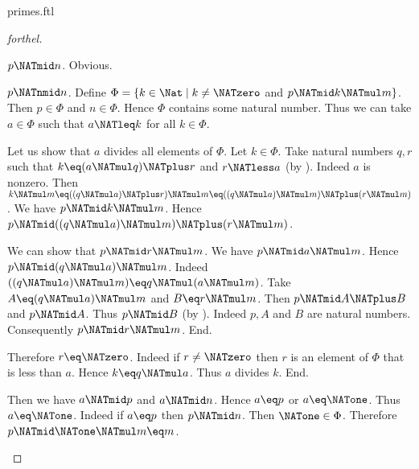 \documentclass{naproche-library}
\begin{document}
\begin{smodule}[title=Prime Numbers]{primes.ftl}
\begin{proof}[forthel]
  \begin{case}{$p \NATmid n$.}
    Obvious.
  \end{case}

  \begin{case}{$p \NATnmid n$.}
    Define $\Phi = \{ k \in \Nat \mid k \neq \NATzero$ and $p \NATmid k \NATmul m \}$.
    Then $p \in \Phi$ and $n \in \Phi$.
    Hence $\Phi$ contains some natural number.
    Thus we can take $a \in \Phi$ such that $a \NATleq k$ for all $k \in \Phi$.

    Let us show that $a$ divides all elements of $\Phi$.
      Let $k \in \Phi$.
      Take natural numbers $q, r$ such that $k \eq (a \NATmul q) \NATplus r$ and $r \NATless a$ (by ).
      Indeed $a$ is nonzero.
      Then $k \NATmul m
        \eq ((q \NATmul a) \NATplus r) \NATmul m
        \eq ((q \NATmul a) \NATmul m) \NATplus (r \NATmul m)$.
      We have $p \NATmid k \NATmul m$.
      Hence $p \NATmid ((q \NATmul a) \NATmul m) \NATplus (r \NATmul m)$.

      We can show that $p \NATmid r \NATmul m$.
        We have $p \NATmid a \NATmul m$.
        Hence $p \NATmid (q \NATmul a) \NATmul m$.
        Indeed $((q \NATmul a) \NATmul m) \eq q \NATmul (a \NATmul m)$. %
        Take $A \eq (q \NATmul a) \NATmul m$ and $B \eq r \NATmul m$. %
        Then $p \NATmid A \NATplus B$ and $p \NATmid A$.
        Thus $p \NATmid B$ (by ).
        Indeed $p, A$ and $B$ are natural numbers.
        Consequently $p \NATmid r \NATmul m$.
      End.

      Therefore $r \eq \NATzero$.
      Indeed if $r \neq \NATzero$ then $r$ is an element of $\Phi$ that is less than $a$.
      Hence $k \eq q \NATmul a$.
      Thus $a$ divides $k$.
    End.

    Then we have $a \NATmid p$ and $a \NATmid n$.
    Hence $a \eq p$ or $a \eq \NATone$.
    Thus $a \eq \NATone$.
    Indeed if $a \eq p$ then $p \NATmid n$.
    Then $\NATone \in \Phi$.
    Therefore $p \NATmid \NATone \NATmul m \eq m$.
  \end{case}
\end{proof}
\end{smodule}
\end{document}
